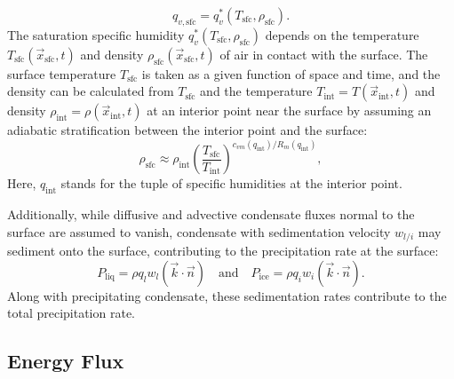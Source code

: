 \documentclass{report}
\begin{document}
\begin{enumerate}
     \[
    q_{v, \mathrm{sfc}} =q_v^*(T_\mathrm{sfc}, \rho_\mathrm{sfc}).
    \]
    The saturation specific humidity $q_v^*(T_\mathrm{sfc}, \rho_\mathrm{sfc})$ depends on the temperature $T_\mathrm{sfc}(\vec{x}_\mathrm{sfc}, t)$ and density $\rho_\mathrm{sfc}(\vec{x}_\mathrm{sfc}, t)$ of air in contact with the surface. The surface temperature $T_\mathrm{sfc}$ is taken as a given function of space and time, and the density can be calculated from $T_\mathrm{sfc}$ and the temperature $T_\mathrm{int} = T(\vec{x}_\mathrm{int}, t)$ and density $\rho_\mathrm{int} = \rho(\vec{x}_\mathrm{int}, t)$ at an interior point near the surface by assuming an adiabatic stratification between the interior point and the surface:
    \begin{equation}\label{e:sfc_density}
    \rho_\mathrm{sfc} \approx \rho_\mathrm{int} \left( \frac{T_\mathrm{sfc}}{T_\mathrm{int}} \right)^{c_{vm}(q_\mathrm{int})/R_m(q_\mathrm{int})},
    \end{equation}
    Here, $q_\mathrm{int}$ stands for the tuple of specific humidities at the interior point.
\end{enumerate}

Additionally, while diffusive and advective condensate fluxes normal to the surface are assumed to vanish, condensate with sedimentation velocity $w_{l/i}$ may sediment onto the surface, contributing to the precipitation rate at the surface:
\begin{equation}
    P_{\mathrm{liq}} = \rho q_{l} w_{l} (\vec{k} \cdot \vec{n}) \quad \text{and} \quad  P_{\mathrm{ice}} = \rho q_{i} w_{i} (\vec{k} \cdot \vec{n}).
\end{equation}
Along with precipitating condensate, these sedimentation rates contribute to the total precipitation rate.

\subsection{Energy Flux}
\end{document}
